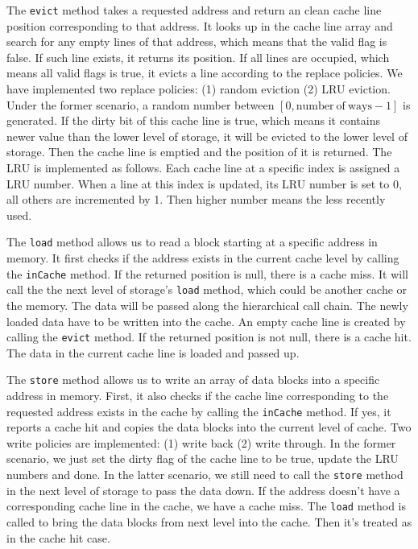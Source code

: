 \documentclass{sig-alternate}
\begin{document}
The \texttt{evict} method takes a requested address and return an clean cache line position corresponding to that address. It looks up in the cache line array and search for any empty lines of that address, which means that the valid flag is false. If such line exists, it returns its position. If all lines are occupied, which means all valid flags is true, it evicts a line according to the replace policies. We have implemented two replace policies: (1) random eviction (2) LRU eviction. Under the former scenario, a random number between $[0, \mathrm{number\ of\ ways} - 1]$ is generated. If the dirty bit of this cache line is true, which means it contains newer value than the lower level of storage, it will be evicted to the lower level of storage. Then the cache line is emptied and the position of it is returned. The LRU is implemented as follows. Each cache line at a specific index is assigned a LRU number. When a line at this index is updated, its LRU number is set to 0, all others are incremented by 1. Then higher number means the less recently used. 

The \texttt{load} method allows us to read a block starting at a specific address in memory. It first checks if the address exists in the current cache level by calling the \texttt{inCache} method. If the returned position is null, there is a cache miss. It will call the the next level of storage's \texttt{load} method, which could be another cache or the memory. The data will be passed along the hierarchical call chain. The newly loaded data have to be written into the cache. An empty cache line is created by calling the \texttt{evict} method. If the returned position is not null, there is a cache hit. The data in the current cache line is loaded and passed up. 

The \texttt{store} method allows us to write an array of data blocks into a specific address in memory. First, it also checks if the cache line corresponding to the requested address exists in the cache by calling the \texttt{inCache} method. If yes, it reports a cache hit and copies the data blocks into the current level of cache. Two write policies are implemented: (1) write back (2) write through. In the former scenario, we just set the dirty flag of the cache line to be true, update the LRU numbers and done. In the latter scenario, we still need to call the \texttt{store} method in the next level of storage to pass the data down. If the address doesn't have a corresponding cache line in the cache, we have a cache miss. The \texttt{load} method is called to bring the data blocks from next level into the cache. Then it's treated as in the cache hit case. 
 
\end{document}
